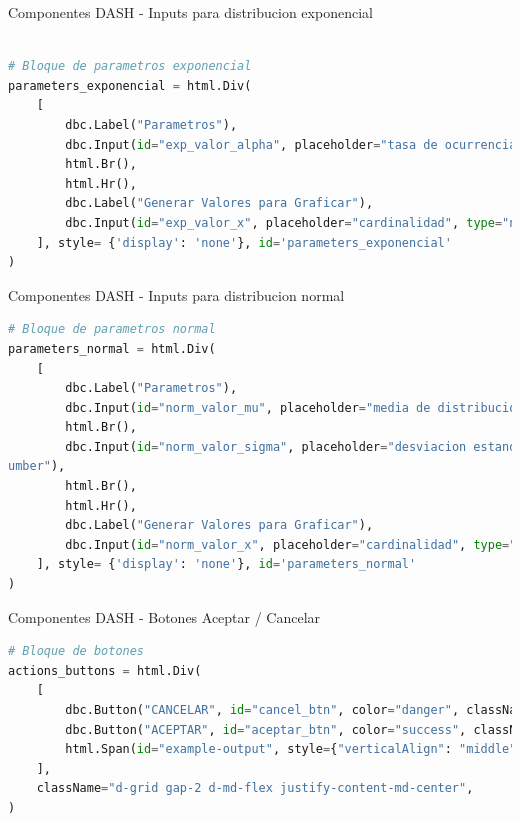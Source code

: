 \documentclass[
	12pt, %
]{fphw}
\begin{document}
{\color{teal}
  \dotfill
  Componentes DASH - Inputs para distribucion exponencial
  \dotfill}

\begin{lstlisting}[language=Python]

# Bloque de parametros exponencial                                                                         
parameters_exponencial = html.Div(
    [
        dbc.Label("Parametros"),
        dbc.Input(id="exp_valor_alpha", placeholder="tasa de ocurrencia del evento > 0", type="number"),
        html.Br(),
        html.Hr(),
        dbc.Label("Generar Valores para Graficar"),
        dbc.Input(id="exp_valor_x", placeholder="cardinalidad", type="number")
    ], style= {'display': 'none'}, id='parameters_exponencial'
)
\end{lstlisting}

\newpage
{\color{teal}
  \dotfill
  Componentes DASH - Inputs para distribucion normal
  \dotfill}

\begin{lstlisting}[language=Python]
# Bloque de parametros normal                                                                              
parameters_normal = html.Div(
    [
        dbc.Label("Parametros"),
        dbc.Input(id="norm_valor_mu", placeholder="media de distribucion", type="number"),
        html.Br(),
        dbc.Input(id="norm_valor_sigma", placeholder="desviacion estandar de la distribucion > 0", type="n\
umber"),
        html.Br(),
        html.Hr(),
        dbc.Label("Generar Valores para Graficar"),
        dbc.Input(id="norm_valor_x", placeholder="cardinalidad", type="number")
    ], style= {'display': 'none'}, id='parameters_normal'
)
\end{lstlisting}


{\color{teal}
  \dotfill
  Componentes DASH - Botones Aceptar / Cancelar
  \dotfill}

\begin{lstlisting}[language=Python]
# Bloque de botones                                                                                        
actions_buttons = html.Div(
    [
        dbc.Button("CANCELAR", id="cancel_btn", color="danger", className="me-1", n_clicks=0),
        dbc.Button("ACEPTAR", id="aceptar_btn", color="success", className="me-1", n_clicks=0),
        html.Span(id="example-output", style={"verticalAlign": "middle","display":"none"}),
    ],
    className="d-grid gap-2 d-md-flex justify-content-md-center",
)
\end{lstlisting}
\end{document}
